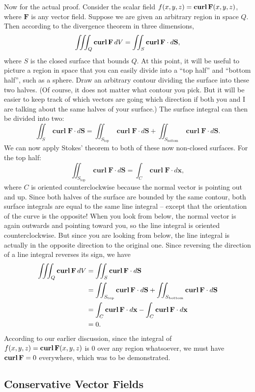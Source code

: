 \documentclass{myarticle}
\let\div\relax %
\DeclareMathOperator{\div}{div}
\DeclareMathOperator{\curl}{\mathbf{curl}}
\renewcommand{\vec}[1]{\mathbf{#1}}
\theoremstyle{nospace}
\newtheorem{old series theorem}{Theorem}
\newenvironment{series theorem}
{\begin{mdframed}\begin{old series theorem}}
    {\end{old series theorem}\end{mdframed}}
\begin{document}
Now for the actual proof. Consider the scalar field
$f(x, y, z) = \div \curl \vec{F}(x, y, z)$, where $\vec{F}$ is any
vector field. Suppose we are given an arbitrary region in space $Q$.
Then according to the divergence theorem in three dimensions,
\[
  \iiint_Q \div \curl \vec{F} \,dV
  = \iint_S \curl \vec{F} \cdot d\vec{S},
\]
where $S$ is the closed surface that bounds $Q$. At this point, it
will be useful to picture a region in space that you can easily divide
into a ``top half'' and ``bottom half'', such as a sphere. Draw an
arbitrary contour dividing the surface into these two halves. (Of
course, it does not matter what contour you pick. But it will be
easier to keep track of which vectors are going which direction if
both you and I are talking about the same halves of your surface.) The
surface integral can then be divided into two:
\[
  \iint_S \curl \vec{F} \cdot d\vec{S}
  = \iint_{S_\text{top}} \curl \vec{F} \cdot d\vec{S}
  + \iint_{S_\text{bottom}} \curl \vec{F} \cdot d\vec{S}.
\]
We can now apply Stokes' theorem to both of these now non-closed
surfaces. For the top half:
\[
  \iint_{S_\text{top}} \curl \vec{F} \cdot d\vec{S}
  = \int_C \curl \vec{F} \cdot d\vec{x},
\]
where $C$ is oriented counterclockwise because the normal vector is
pointing out and up. Since both halves of the surface are bounded by
the same contour, both surface integrals are equal to the same line
integral -- except that the orientation of the curve is the opposite!
When you look from below, the normal vector is again outwards and
pointing toward you, so the line integral is oriented
counterclockwise. But since you are looking from below, the line
integral is actually in the opposite direction to the original one.
Since reversing the direction of a line integral reverses its sign, we
have
\begin{align*}
  \iiint_Q \div \curl \vec{F} \,dV
  &= \iint_S \curl \vec{F} \cdot d\vec{S} \\
  &= \iint_{S_\text{top}} \curl \vec{F} \cdot d\vec{S}
    + \iint_{S_\text{bottom}} \curl \vec{F} \cdot d\vec{S} \\
  &= \int_C \curl \vec{F} \cdot d\vec{x}
    - \int_C \curl \vec{F} \cdot d\vec{x} \\
  &= 0.
\end{align*}
According to our earlier discussion, since the integral of
$f(x, y, z) = \div \curl \vec{F}(x, y, z)$ is $0$ over any region
whatsoever, we must have $\div \curl \vec{F} = 0$ everywhere, which
was to be demonstrated.

\subsection{Conservative Vector Fields}
\label{sec:conservative vector fields}
\end{document}
